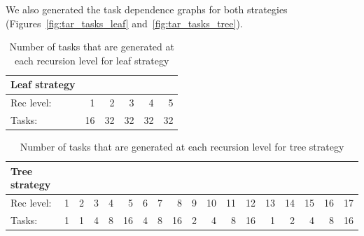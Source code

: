 We also generated the task dependence graphs for both strategies (Figures~\ref{fig:tar_tasks_leaf} and~\ref{fig:tar_tasks_tree}).
\begin{table}[H]
\centering
\begin{tabular}{lrrrrr}
\toprule
Leaf strategy & & & & & \\
\midrule
Rec level:        & 1     & 2     & 3     & 4     & 5  \\
Tasks:    & 16    & 32    & 32    & 32    & 32 \\
\bottomrule
\end{tabular}

\caption{Number of tasks that are generated at each recursion level for leaf strategy} 
\label{tab:leaf_tasks-rec_level}
\end{table}

\begin{table}[H]
\centering
\begin{tabular}{lrrrrrrrrrrrrrrrrr}
\toprule
Tree strategy & & & & & & & & & & & & & & & & &\\
\midrule
Rec level:        & 1     & 2     & 3     & 4     & 5     & 6     & 7     & 8     & 9     & 10    & 11    & 12    & 13    & 14    & 15    & 16    & 17  \\
Tasks:    & 1     & 1     & 4     & 8     & 16    & 4     & 8     & 16    & 2     & 4     & 8     & 16    & 1     & 2     & 4     & 8    & 16 \\
\bottomrule
\end{tabular}

\caption{Number of tasks that are generated at each recursion level for tree strategy} 
\label{tab:tree_tasks-rec_level}
\end{table}


